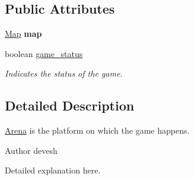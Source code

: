 \subsection*{Public Attributes}
\begin{DoxyCompactItemize}
\item 
\hypertarget{classorg_1_1shaastra_1_1automania_1_1Arena_a3d331629f0c72cef37a3bfc409d599db}{
\hyperlink{classorg_1_1shaastra_1_1automania_1_1Map}{\-M\-a\-p} {\bfseries \-m\-a\-p}}
\label{classorg_1_1shaastra_1_1automania_1_1Arena_a3d331629f0c72cef37a3bfc409d599db}

\item 
\hypertarget{classorg_1_1shaastra_1_1automania_1_1Arena_aa6445f71a9fb404e564f2151d6260b6c}{
\-b\-o\-o\-l\-e\-a\-n \hyperlink{classorg_1_1shaastra_1_1automania_1_1Arena_aa6445f71a9fb404e564f2151d6260b6c}{\-g\-a\-m\-e\_\-\-s\-t\-a\-t\-u\-s}}
\label{classorg_1_1shaastra_1_1automania_1_1Arena_aa6445f71a9fb404e564f2151d6260b6c}

\begin{DoxyCompactList}\small\item\em Indicates the status of the game. \end{DoxyCompactList}\end{DoxyCompactItemize}


\subsection{Detailed Description}
\hyperlink{classorg_1_1shaastra_1_1automania_1_1Arena}{Arena} is the platform on which the game happens. 

\begin{DoxyAuthor}{Author}
devesh
\end{DoxyAuthor}
Detailed explanation here. 

